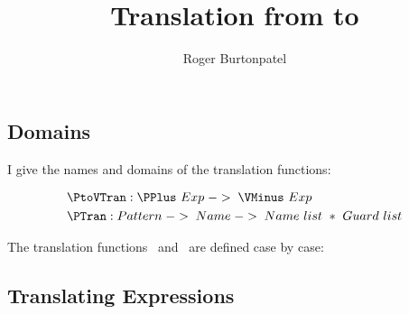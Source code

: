 \documentclass[]{article}
\title{Translation from {\PPlus} to {\VMinus}}
\author{Roger Burtonpatel}
\begin{document}
\maketitle

\subsection{Domains}
I give the names and domains of the translation functions: 

\begin{align*}
    &\PtoVTran: \PPlus\ Exp\; ->\; \VMinus\ Exp \\
    &\PTran: Pattern\; ->\; Name\; ->\; Name\ list\ *\ Guard\ list \\
    \end{align*}

The translation functions \PtoVTran\ and \PTran\ are defined case by case: 



\subsection{Translating Expressions}

\newcommand\btran[1]{\mathcal{B}[\![#1]\!]}
\end{document}
